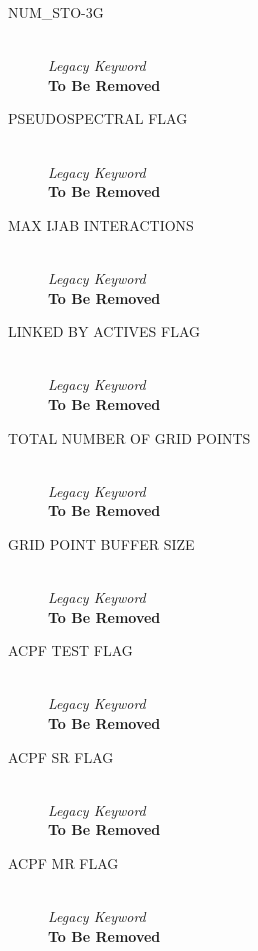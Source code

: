 \documentclass{article}
\begin{document}
\begin{description}
 
        \item[NUM\_STO-3G] \hfill \\
        \emph{Legacy Keyword} \hfill \\
        \textbf{To Be Removed}
        \item[PSEUDOSPECTRAL FLAG] \hfill \\
        \emph{Legacy Keyword} \hfill \\
        \textbf{To Be Removed}
        \item[MAX IJAB INTERACTIONS] \hfill \\
        \emph{Legacy Keyword} \hfill \\
        \textbf{To Be Removed}
        \item[LINKED BY ACTIVES FLAG] \hfill \\
        \emph{Legacy Keyword} \hfill \\
        \textbf{To Be Removed}
        \item[TOTAL NUMBER OF GRID POINTS] \hfill \\
        \emph{Legacy Keyword} \hfill \\
        \textbf{To Be Removed}
        \item[GRID POINT BUFFER SIZE] \hfill \\
        \emph{Legacy Keyword} \hfill \\
        \textbf{To Be Removed}
        \item[ACPF TEST FLAG] \hfill \\
        \emph{Legacy Keyword} \hfill \\
        \textbf{To Be Removed}
        \item[ACPF SR FLAG] \hfill \\
        \emph{Legacy Keyword} \hfill \\
        \textbf{To Be Removed}
        \item[ACPF MR FLAG] \hfill \\
        \emph{Legacy Keyword} \hfill \\
        \textbf{To Be Removed} 
\end{description}
\end{document}
